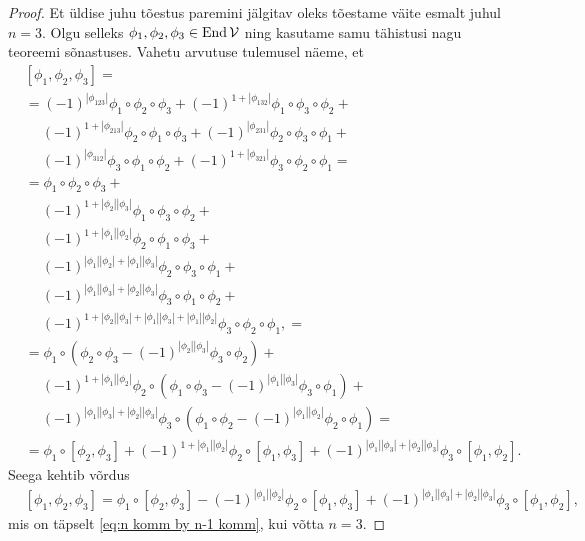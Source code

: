 \begin{proof}
    Et üldise juhu tõestus paremini jälgitav oleks tõestame väite
    esmalt juhul $n=3$. Olgu selleks
    $\phi_1, \phi_2, \phi_3 \in \operatorname{End} \mathcal{V}$ ning kasutame samu
    tähistusi nagu teoreemi sõnastuses. Vahetu arvutuse tulemusel
    näeme, et
    \begin{align*}
        &[\phi_1, \phi_2, \phi_3] = \\
        &= (-1)^{|\phi_{123}|} \phi_1 \circ \phi_2 \circ \phi_3 +
        (-1)^{1 + |\phi_{132}|} \phi_1 \circ \phi_3 \circ \phi_2 + \\
        &\ \quad (-1)^{1 + |\phi_{213}|}
            \phi_2 \circ \phi_1 \circ \phi_3 +
        (-1)^{|\phi_{231}|} \phi_2 \circ \phi_3 \circ \phi_1 + \\
        &\ \quad (-1)^{|\phi_{312}|} \phi_3 \circ \phi_1 \circ \phi_2 +
        (-1)^{1 + |\phi_{321}|} \phi_3 \circ \phi_2 \circ \phi_1 = \\
        &= \phi_1 \circ \phi_2 \circ \phi_3 + \\
        &\ \quad (-1)^{1 + |\phi_2||\phi_3|}
            \phi_1 \circ \phi_3 \circ \phi_2 + \\
        &\ \quad (-1)^{1 + |\phi_1||\phi_2|}
            \phi_2 \circ \phi_1 \circ \phi_3 + \\
        &\ \quad (-1)^{|\phi_1||\phi_2|+|\phi_1||\phi_3|}
            \phi_2 \circ \phi_3 \circ \phi_1 + \\
        &\ \quad (-1)^{|\phi_1||\phi_3|+|\phi_2||\phi_3|}
            \phi_3 \circ \phi_1 \circ \phi_2 + \\
        &\ \quad (-1)^{
                1 + |\phi_2||\phi_3|+|\phi_1||\phi_3|+|\phi_1||\phi_2|
            } \phi_3 \circ \phi_2 \circ \phi_1, = \\
        &= \phi_1 \circ \left(
            \phi_2 \circ \phi_3 -
            (-1)^{|\phi_2||\phi_3|} \phi_3 \circ \phi_2
        \right) + \\
        &\ \quad (-1)^{1 + |\phi_1||\phi_2|} \phi_2 \circ \left(
            \phi_1 \circ \phi_3 -
            (-1)^{|\phi_1||\phi_3|} \phi_3 \circ \phi_1
        \right) + \\
        &\ \quad (-1)^{|\phi_1||\phi_3|+|\phi_2||\phi_3|} \phi_3 \circ
        \left(
            \phi_1 \circ \phi_2 -
            (-1)^{|\phi_1||\phi_2|} \phi_2 \circ \phi_1
        \right) = \\
        &= \phi_1 \circ [\phi_2, \phi_3] +
            (-1)^{1 + |\phi_1||\phi_2|} \phi_2 \circ [\phi_1, \phi_3] + 
            (-1)^{|\phi_1||\phi_3|+|\phi_2||\phi_3|} \phi_3 \circ [\phi_1, \phi_2].
    \end{align*}
    Seega kehtib võrdus
    \begin{align*}
        &[\phi_1, \phi_2, \phi_3] =
        \phi_1 \circ [\phi_2, \phi_3] -
        (-1)^{|\phi_1||\phi_2|} \phi_2 \circ [\phi_1, \phi_3] +
        (-1)^{|\phi_1||\phi_3| + |\phi_2||\phi_3|}
            \phi_3 \circ [\phi_1, \phi_2],
    \end{align*}
    mis on täpselt \eqref{eq:n komm by n-1 komm}, kui võtta $n = 3$.


\end{proof}
